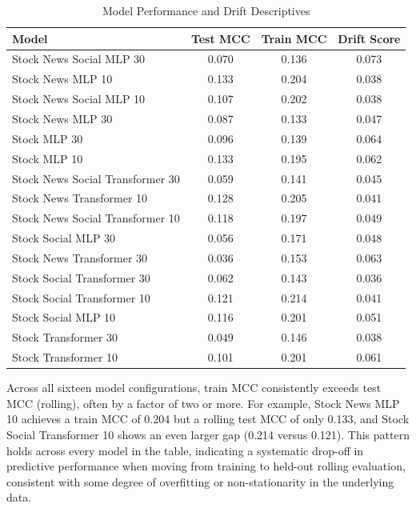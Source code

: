 \documentclass[stu,floatsintext]{apa7}
\begin{document}
\begin{table}[htbp]
\centering
\caption{Model Performance and Drift Descriptives}
\label{tab:model_descriptives}
\begin{tabular}{lccc}
\toprule
Model & Test MCC & Train MCC & Drift Score \\
\midrule
Stock News Social MLP 30         & 0.070 & 0.136 & 0.073 \\
Stock News MLP 10                & 0.133 & 0.204 & 0.038 \\
Stock News Social MLP 10         & 0.107 & 0.202 & 0.038 \\
Stock News MLP 30                & 0.087 & 0.133 & 0.047 \\
Stock MLP 30                     & 0.096 & 0.139 & 0.064 \\
Stock MLP 10                     & 0.133 & 0.195 & 0.062 \\
Stock News Social Transformer 30 & 0.059 & 0.141 & 0.045 \\
Stock News Transformer 10        & 0.128 & 0.205 & 0.041 \\
Stock News Social Transformer 10 & 0.118 & 0.197 & 0.049 \\
Stock Social MLP 30              & 0.056 & 0.171 & 0.048 \\
Stock News Transformer 30        & 0.036 & 0.153 & 0.063 \\
Stock Social Transformer 30      & 0.062 & 0.143 & 0.036 \\
Stock Social Transformer 10      & 0.121 & 0.214 & 0.041 \\
Stock Social MLP 10              & 0.116 & 0.201 & 0.051 \\
Stock Transformer 30             & 0.049 & 0.146 & 0.038 \\
Stock Transformer 10             & 0.101 & 0.201 & 0.061 \\
\bottomrule
\end{tabular}
\end{table}

Across all sixteen model configurations, train MCC consistently exceeds test MCC (rolling), often by a factor of two or more. For example, Stock News MLP 10 achieves a train MCC of 0.204 but a rolling test MCC of only 0.133, and Stock Social Transformer 10 shows an even larger gap (0.214 versus 0.121). This pattern holds across every model in the table, indicating a systematic drop-off in predictive performance when moving from training to held-out rolling evaluation, consistent with some degree of overfitting or non-stationarity in the underlying data.
\end{document}
